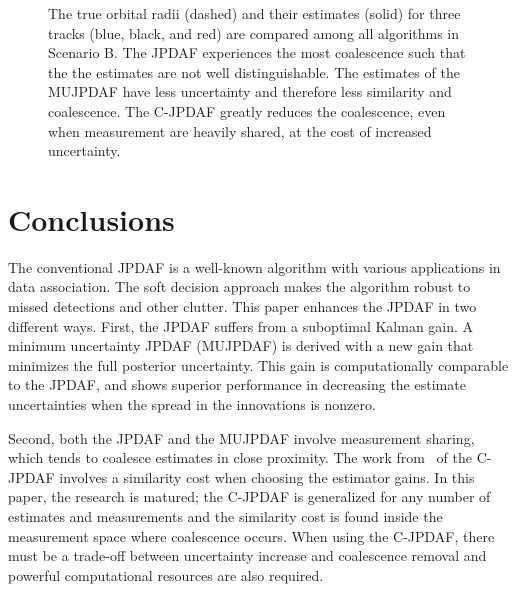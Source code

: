 \documentclass[letterpaper, 10pt, conference]{ieeeconf}
\begin{document}
\begin{figure}
\centerline{
	}
\centerline{
	}
\centerline{
	}
\caption{The true orbital radii (dashed) and their estimates (solid) for three tracks (blue, black, and red) are compared among all algorithms in Scenario B.
The JPDAF experiences the most coalescence such that the the estimates are not well distinguishable.
The estimates of the MUJPDAF have less uncertainty and therefore less similarity and coalescence.
The C-JPDAF greatly reduces the coalescence, even when measurement are heavily shared, at the cost of increased uncertainty.
}\label{fig:CompareJPDAFandOJPDAFandCJPDAF}
\end{figure}


\section{Conclusions}
\label{Conclusion}

The conventional JPDAF is a well-known algorithm with various applications in data association.
The soft decision approach makes the algorithm robust to missed detections and other clutter.
This paper enhances the JPDAF in two different ways.
First, the JPDAF suffers from a suboptimal Kalman gain.
A minimum uncertainty JPDAF (MUJPDAF) is derived with a new gain that minimizes the full posterior uncertainty.
This gain is computationally comparable to the JPDAF, and shows superior performance in decreasing the estimate uncertainties when the spread in the innovations is nonzero.

Second, both the JPDAF and the MUJPDAF involve measurement sharing, which tends to coalesce estimates in close proximity.
The work from~\cite{KauLovLee14} of the C-JPDAF involves a similarity cost when choosing the estimator gains.
In this paper, the research is matured; the C-JPDAF is generalized for any number of estimates and measurements and the similarity cost is found inside the measurement space where coalescence occurs.
When using the C-JPDAF, there must be a trade-off between uncertainty increase and coalescence removal and powerful computational resources are also required.



\end{document}
